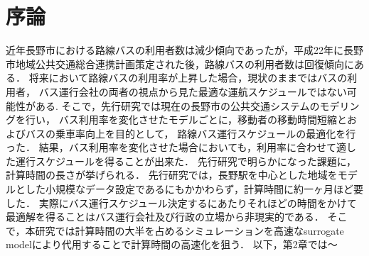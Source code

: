 \documentclass[main]{subfiles}
\begin{document}
\chapter{序論}
近年長野市における路線バスの利用者数は減少傾向であったが，平成22年に長野市地域公共交通総合連携計画策定された後，路線バスの利用者数は回復傾向にある．\cite{naganokeikaku}
将来において路線バスの利用率が上昇した場合，現状のままではバスの利用者，
バス運行会社の両者の視点から見た最適な運航スケジュールではない可能性がある.
そこで，先行研究では現在の長野市の公共交通システムのモデリングを行い，
バス利用率を変化させたモデルごとに，移動者の移動時間短縮とおよびバスの乗車率向上を目的として，
路線バス運行スケジュールの最適化を行った．\cite{senkoukenkyu}
結果，バス利用率を変化させた場合においても，利用率に合わせて適した運行スケジュールを得ることが出来た．
先行研究で明らかになった課題に，計算時間の長さが挙げられる．
先行研究では，長野駅を中心とした地域をモデルとした小規模なデータ設定であるにもかかわらず，計算時間に約一ヶ月ほど要した．
実際にバス運行スケジュール決定するにあたりそれほどの時間をかけて最適解を得ることはバス運行会社及び行政の立場から非現実的である．
そこで，本研究では計算時間の大半を占めるシミュレーションを高速なsurrogate modelにより代用することで計算時間の高速化を狙う．
以下，第2章では～
\end{document}

